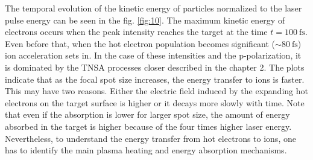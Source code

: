 The temporal evolution of the kinetic energy of particles normalized to the laser pulse energy can be seen in the fig. \ref{fig:10}. The maximum kinetic energy of electrons occurs when the peak intensity reaches the target at the time $ t = 100 \ \mathrm{fs} $. Even before that, when the hot electron population becomes significant ($ \sim 80 \ \mathrm{fs} $) ion acceleration sets in. In the case of these intensities and the p-polarization, it is dominated by the TNSA processes closer described in the chapter 2. The plots indicate that as the focal spot size increases, the energy transfer to ions is faster. This may have two reasons. Either the electric field induced by the expanding hot electrons on the target surface is higher or it decays more slowly with time. Note that even if the absorption is lower for larger spot size, the amount of energy absorbed in the target is higher because of the four times higher laser energy. Nevertheless, to understand the energy transfer from hot electrons to ions, one has to identify the main plasma heating and energy absorption mechanisms.

